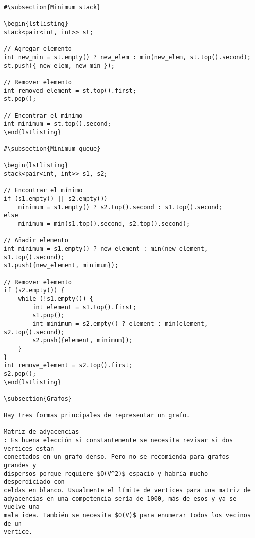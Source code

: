 \documentclass[11pt]{article}
\begin{document}
\begin{verbatim}
#\subsection{Minimum stack}

\begin{lstlisting}
stack<pair<int, int>> st;

// Agregar elemento
int new_min = st.empty() ? new_elem : min(new_elem, st.top().second);
st.push({ new_elem, new_min });

// Remover elemento
int removed_element = st.top().first;
st.pop();

// Encontrar el mínimo
int minimum = st.top().second;
\end{lstlisting}

#\subsection{Minimum queue}

\begin{lstlisting}
stack<pair<int, int>> s1, s2;

// Encontrar el mínimo
if (s1.empty() || s2.empty()) 
    minimum = s1.empty() ? s2.top().second : s1.top().second;
else
    minimum = min(s1.top().second, s2.top().second);

// Añadir elemento
int minimum = s1.empty() ? new_element : min(new_element, s1.top().second);
s1.push({new_element, minimum});

// Remover elemento
if (s2.empty()) {
    while (!s1.empty()) {
        int element = s1.top().first;
        s1.pop();
        int minimum = s2.empty() ? element : min(element, s2.top().second);
        s2.push({element, minimum});
    }
}
int remove_element = s2.top().first;
s2.pop();
\end{lstlisting}

\subsection{Grafos}

Hay tres formas principales de representar un grafo.

Matriz de adyacencias
: Es buena elección si constantemente se necesita revisar si dos vertices estan
conectados en un grafo denso. Pero no se recomienda para grafos grandes y
dispersos porque requiere $O(V^2)$ espacio y habría mucho desperdiciado con
celdas en blanco. Usualmente el límite de vertices para una matriz de
adyacencias en una competencia sería de 1000, más de esos y ya se vuelve una
mala idea. También se necesita $O(V)$ para enumerar todos los vecinos de un
vertice.


\end{verbatim}
\end{document}
